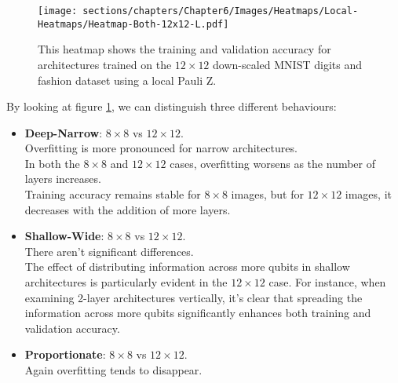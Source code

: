 \begin{figure}[h]
    \centering
    \texttt{[image: sections/chapters/Chapter6/Images/Heatmaps/Local-Heatmaps/Heatmap-Both-12x12-L.pdf]}
    \caption{This heatmap shows the training and validation accuracy for architectures 
    trained on the $12\times12$ down-scaled MNIST digits and fashion dataset using a local Pauli Z.}
    \label{fig:heatmap-12x12-L}
\end{figure}

By looking at figure \ref{fig:heatmap-12x12-L}, we can distinguish 
three different behaviours:

\begin{itemize}
    \item \textbf{Deep-Narrow}: $8 \times 8$ vs $12 \times 12$.\\
    Overfitting is more pronounced for narrow architectures.\\
    In both the $8 \times 8$ and $12 \times 12$ cases, overfitting worsens as the number of layers increases. \\
    Training accuracy remains stable for $8 \times 8$ images, but for $12 \times 12$ images, 
    it decreases with the addition of more layers.
    \item \textbf{Shallow-Wide}: $8 \times 8$ vs $12 \times 12$.\\
    There aren't significant differences.\\
    The effect of distributing information across more qubits in shallow architectures is particularly 
    evident in the $12 \times 12$ case. For instance, when examining 2-layer architectures vertically, 
    it's clear that spreading the information across more qubits significantly enhances both training and 
    validation accuracy.
    \item \textbf{Proportionate}: $8 \times 8$ vs $12 \times 12$.\\
    Again overfitting tends to disappear. \\
 \end{itemize}